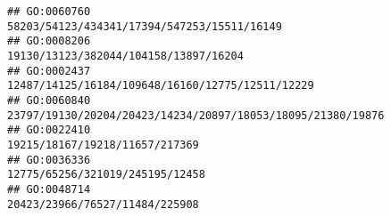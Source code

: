 \documentclass[
]{article}
\begin{document}
\begin{verbatim}
## GO:0060760                                                                                                                                                                                                                                                                                                                                                                  58203/54123/434341/17394/547253/15511/16149
## GO:0008206                                                                                                                                                                                                                                                                                                                                                                        19130/13123/382044/104158/13897/16204
## GO:0002437                                                                                                                                                                                                                                                                                                                                                             12487/14125/16184/109648/16160/12775/12511/12229
## GO:0060840                                                                                                                                                                                                                                                                                                                                                  23797/19130/20204/20423/14234/20897/18053/18095/21380/19876
## GO:0022410                                                                                                                                                                                                                                                                                                                                                                               19215/18167/19218/11657/217369
## GO:0036336                                                                                                                                                                                                                                                                                                                                                                              12775/65256/321019/245195/12458
## GO:0048714                                                                                                                                                                                                                                                                                                                                                                               20423/23966/76527/11484/225908

\end{verbatim}
\end{document}
